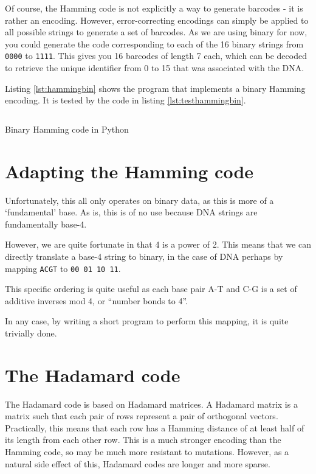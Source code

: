 \documentclass[a4paper,11pt]{article}
\newenvironment{longlisting}
{\addvspace{\baselineskip}\captionsetup{type=listing}}
{\addvspace{\baselineskip}}
\begin{document}

    Of course, the Hamming code is not explicitly a way to generate barcodes -
    it is rather an encoding. However, error-correcting encodings can simply be
    applied to all possible strings to generate a set of barcodes. As we are
    using binary for now, you could generate the code corresponding to each of
    the 16 binary strings from \texttt{0000} to \texttt{1111}. This gives you 16
    barcodes of length 7 each, which can be decoded to retrieve the unique
    identifier from 0 to 15 that was associated with the DNA.

    Listing \ref{lst:hammingbin} shows the program that implements a binary
    Hamming encoding. It is tested by the code in listing
    \ref{lst:testhammingbin}.

\begin{longlisting}
\inputminted{python}{../src/encode_hamming.py}
\caption{Binary Hamming code in Python}\label{lst:hammingbin}
\end{longlisting}

    \section{Adapting the Hamming code}

    Unfortunately, this all only operates on binary data, as this is more of a
    `fundamental' base. As is, this is of no use because DNA strings are
    fundamentally base-4.

    However, we are quite fortunate in that 4 is a power of 2. This means that
    we can directly translate a base-4 string to binary, in the case of DNA
    perhaps by mapping \texttt{ACGT} to \texttt{00 01 10 11}.

    This specific ordering is quite useful as each base pair A-T and C-G is a
    set of additive inverses mod 4, or ``number bonds to 4''.

    In any case, by writing a short program to perform this mapping, it is quite
    trivially done.

    \section{The Hadamard code}


    The Hadamard code is based on Hadamard matrices. A Hadamard matrix is a
    matrix such that each pair of rows represent a pair of orthogonal vectors.
    Practically, this means that each row has a Hamming distance of at least
    half of its length from each other row. This is a much stronger encoding
    than the Hamming code, so may be much more resistant to mutations. However,
    as a natural side effect of this, Hadamard codes are longer and more sparse.
\end{document}

